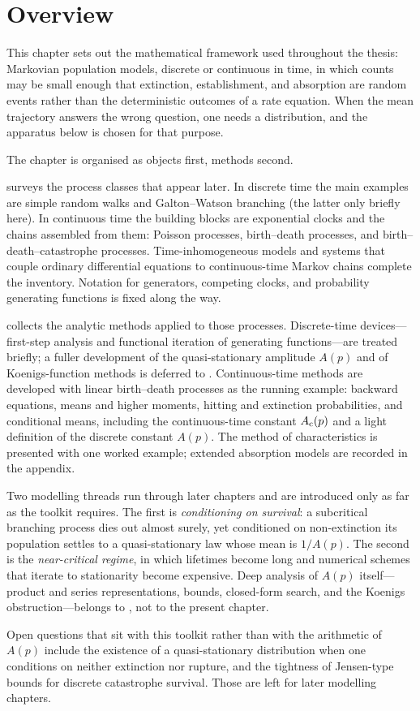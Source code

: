 \section{Overview}
\label{m:sec:overview}

This chapter sets out the mathematical framework used throughout the thesis: Markovian
population models, discrete or continuous in time, in which counts may be small enough
that extinction, establishment, and absorption are random events rather than the
deterministic outcomes of a rate equation. When the mean trajectory answers the wrong
question, one needs a distribution, and the apparatus below is chosen for that purpose.

The chapter is organised as objects first, methods second.

 surveys the process classes that appear later. In discrete time the
main examples are simple random walks and Galton--Watson branching (the latter only
briefly here). In continuous time the building blocks are exponential clocks and the
chains assembled from them: Poisson processes, birth--death processes, and
birth--death--catastrophe processes. Time-inhomogeneous models and systems that couple
ordinary differential equations to continuous-time Markov chains complete the inventory.
Notation for generators, competing clocks, and probability generating functions is fixed
along the way.

 collects the analytic methods applied to those processes.
Discrete-time devices---first-step analysis and functional iteration of generating
functions---are treated briefly; a fuller development of the quasi-stationary amplitude
$A(p)$ and of Koenigs-function methods is deferred to \ChA. Continuous-time methods are
developed with linear birth--death processes as the running example: backward equations,
means and higher moments, hitting and extinction probabilities, and conditional means,
including the continuous-time constant $A_{\mathrm{c}}(p)$ and a light definition of the discrete
constant $A(p)$. The method of characteristics is presented with one worked example;
extended absorption models are recorded in the appendix.

Two modelling threads run through later chapters and are introduced only as far as the
toolkit requires. The first is \emph{conditioning on survival}: a subcritical branching
process dies out almost surely, yet conditioned on non-extinction its population settles
to a quasi-stationary law whose mean is $1/A(p)$. The second is the \emph{near-critical
regime}, in which lifetimes become long and numerical schemes that iterate to stationarity
become expensive. Deep analysis of $A(p)$ itself---product and series representations,
bounds, closed-form search, and the Koenigs obstruction---belongs to \ChA, not to the
present chapter.

Open questions that sit with this toolkit rather than with the arithmetic of $A(p)$ include
the existence of a quasi-stationary distribution when one conditions on neither extinction
nor rupture, and the tightness of Jensen-type bounds for discrete catastrophe survival.
Those are left for later modelling chapters.
